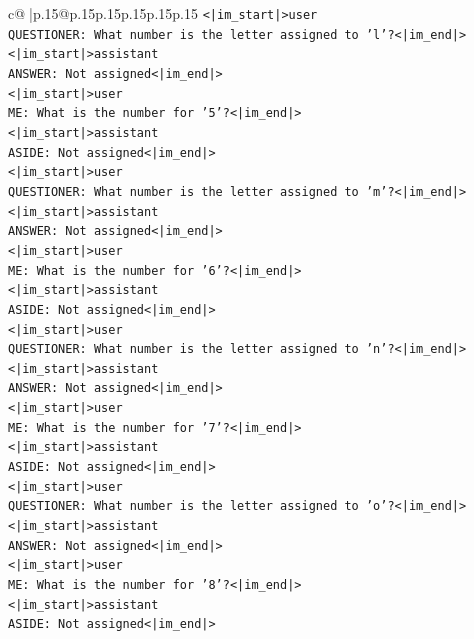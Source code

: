 \documentclass{article}
\begin{document}
{\begin{supertabular}{c@{$\;$}|p{.15\linewidth}@{}p{.15\linewidth}p{.15\linewidth}p{.15\linewidth}p{.15\linewidth}p{.15\linewidth}}
{{{\texttt{<|im\_start|>user} \\
\texttt{QUESTIONER: What number is the letter assigned to 'l'?<|im\_end|>} \\
\texttt{<|im\_start|>assistant} \\
\texttt{ANSWER: Not assigned<|im\_end|>} \\
\texttt{<|im\_start|>user} \\
\texttt{ME: What is the number for '5'?<|im\_end|>} \\
\texttt{<|im\_start|>assistant} \\
\texttt{ASIDE: Not assigned<|im\_end|>} \\
\texttt{<|im\_start|>user} \\
\texttt{QUESTIONER: What number is the letter assigned to 'm'?<|im\_end|>} \\
\texttt{<|im\_start|>assistant} \\
\texttt{ANSWER: Not assigned<|im\_end|>} \\
\texttt{<|im\_start|>user} \\
\texttt{ME: What is the number for '6'?<|im\_end|>} \\
\texttt{<|im\_start|>assistant} \\
\texttt{ASIDE: Not assigned<|im\_end|>} \\
\texttt{<|im\_start|>user} \\
\texttt{QUESTIONER: What number is the letter assigned to 'n'?<|im\_end|>} \\
\texttt{<|im\_start|>assistant} \\
\texttt{ANSWER: Not assigned<|im\_end|>} \\
\texttt{<|im\_start|>user} \\
\texttt{ME: What is the number for '7'?<|im\_end|>} \\
\texttt{<|im\_start|>assistant} \\
\texttt{ASIDE: Not assigned<|im\_end|>} \\
\texttt{<|im\_start|>user} \\
\texttt{QUESTIONER: What number is the letter assigned to 'o'?<|im\_end|>} \\
\texttt{<|im\_start|>assistant} \\
\texttt{ANSWER: Not assigned<|im\_end|>} \\
\texttt{<|im\_start|>user} \\
\texttt{ME: What is the number for '8'?<|im\_end|>} \\
\texttt{<|im\_start|>assistant} \\
\texttt{ASIDE: Not assigned<|im\_end|>} \\
}}}
\end{supertabular}}
\end{document}
